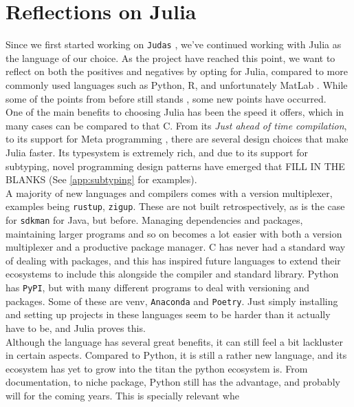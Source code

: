 \section*{Reflections on Julia}
\label{sec:juliaref}

Since we first started working on \texttt{Judas} \cite{projthesis}, we've continued working with Julia as the language of our choice. As the project have reached this point, we want to reflect on both the positives and negatives by opting for Julia, compared to more commonly used languages such as Python, R, and unfortunately MatLab \cite{matlabpyr}. While some of the points from before still stands \cite{projthesis}, some new points have occurred. \\

One of the main benefits to choosing Julia has been the speed it offers, which in many cases can be compared to that C. From its \textit{Just ahead of time compilation}, to its support for Meta programming \cite{whyjulia} \cite{julia}, there are several design choices that make Julia faster. Its typesystem is extremely rich, and due to its support for subtyping, novel programming design patterns have emerged that FILL IN THE BLANKS (See \ref{app:subtyping} for examples). \\ 

A majority of new languages and compilers comes with a version multiplexer, examples being \texttt{rustup}, \texttt{zigup}. These are not built retrospectively, as is the case for \texttt{sdkman} for Java, but before. Managing dependencies and packages, maintaining larger programs and so on becomes a lot easier with both a version multiplexer and a productive package manager. C has never had a standard way of dealing with packages, and this has inspired future languages to extend their ecosystems to include this alongside the compiler and standard library. Python has \texttt{PyPI}, but with many different programs to deal with versioning and packages. Some of these are venv, \texttt{Anaconda} and \texttt{Poetry}. Just simply installing and setting up projects in these languages seem to be harder than it actually have to be, and Julia proves this. \\ 


Although the language has several great benefits, it can still feel a bit lackluster in certain aspects. Compared to Python, it is still a rather new language, and its ecosystem has yet to grow into the titan the python ecosystem is. From documentation, to niche package, Python still has the advantage, and probably will for the coming years. This is specially relevant whe \\


